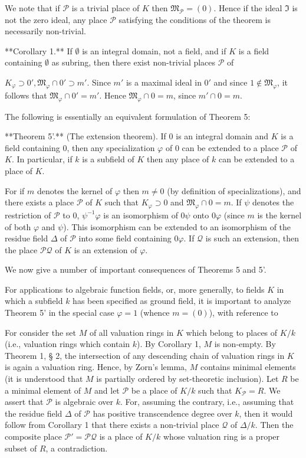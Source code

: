 We note that if $\mathcal{P}$ is a trivial place of $K$ then $\mathfrak{M}_\mathcal{P} = (0)$. Hence if the ideal $\Im$ is not the zero ideal, any place $\mathcal{P}$ satisfying the conditions of the theorem is necessarily non-trivial.

**Corollary 1.** If $\emptyset$ is an integral domain, not a field, and if $K$ is a field containing $\emptyset$ as subring, then there exist non-trivial places $\mathcal{P}$ of

$K_{\varphi} \supset 0', \mathfrak{M}_{\varphi} \cap 0' \supset m'$. Since $m'$ is a maximal ideal in $0'$ and since $1 \notin \mathfrak{M}_{\varphi}$, it follows that $\mathfrak{M}_{\varphi} \cap 0' = m'$. Hence $\mathfrak{M}_{\varphi} \cap 0 = m$, since $m' \cap 0 = m$.

The following is essentially an equivalent formulation of Theorem 5:

**Theorem 5'.** (The extension theorem). If $0$ is an integral domain and $K$ is a field containing $0$, then any specialization $\varphi$ of $0$ can be extended to a place $\mathcal{P}$ of $K$. In particular, if $k$ is a subfield of $K$ then any place of $k$ can be extended to a place of $K$.

For if $m$ denotes the kernel of $\varphi$ then $m \neq 0$ (by definition of specializations), and there exists a place $\mathcal{P}$ of $K$ such that $K_{\varphi} \supset 0$ and $\mathfrak{M}_{\varphi} \cap 0 = m$. If $\psi$ denotes the restriction of $\mathcal{P}$ to $0$, $\psi^{-1}\varphi$ is an isomorphism of $0\psi$ onto $0\varphi$ (since $m$ is the kernel of both $\varphi$ and $\psi$). This isomorphism can be extended to an isomorphism of the residue field $\Delta$ of $\mathcal{P}$ into some field containing $0\varphi$. If $\mathcal{Q}$ is such an extension, then the place $\mathcal{P}\mathcal{Q}$ of $K$ is an extension of $\varphi$.

We now give a number of important consequences of Theorems 5 and 5'.

For applications to algebraic function fields, or, more generally, to fields $K$ in which a subfield $k$ has been specified as ground field, it is important to analyze Theorem 5' in the special case $\varphi = 1$ (whence $m = (0)$), with reference to

For consider the set $M$ of all valuation rings in $K$ which belong to places of $K/k$ (i.e., valuation rings which contain $k$). By Corollary 1, $M$ is non-empty. By Theorem 1, § 2, the intersection of any descending chain of valuation rings in $K$ is again a valuation ring. Hence, by Zorn’s lemma, $M$ contains minimal elements (it is understood that $M$ is partially ordered by set-theoretic inclusion). Let $R$ be a minimal element of $M$ and let $\mathcal{P}$ be a place of $K/k$ such that $K_{\mathcal{P}} = R$. We assert that $\mathcal{P}$ is algebraic over $k$. For, assuming the contrary, i.e., assuming that the residue field $\Delta$ of $\mathcal{P}$ has positive transcendence degree over $k$, then it would follow from Corollary 1 that there exists a non-trivial place $\mathcal{Q}$ of $\Delta/k$. Then the composite place $\mathcal{P}' = \mathcal{P} \mathcal{Q}$ is a place of $K/k$ whose valuation ring is a proper subset of $R$, a contradiction.